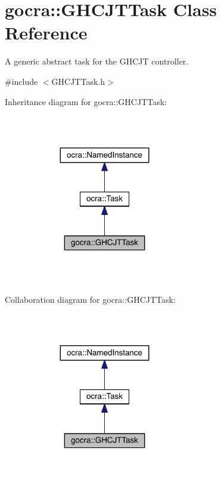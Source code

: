 \hypertarget{classgocra_1_1GHCJTTask}{}\section{gocra\+:\+:G\+H\+C\+J\+T\+Task Class Reference}
\label{classgocra_1_1GHCJTTask}


A generic abstract task for the G\+H\+C\+JT controller.  




{\ttfamily \#include $<$G\+H\+C\+J\+T\+Task.\+h$>$}



Inheritance diagram for gocra\+:\+:G\+H\+C\+J\+T\+Task\+:\nopagebreak
\begin{figure}[H]
\begin{center}
\leavevmode
\includegraphics[width=191pt]{d8/df9/classgocra_1_1GHCJTTask__inherit__graph}
\end{center}
\end{figure}


Collaboration diagram for gocra\+:\+:G\+H\+C\+J\+T\+Task\+:\nopagebreak
\begin{figure}[H]
\begin{center}
\leavevmode
\includegraphics[width=191pt]{db/da9/classgocra_1_1GHCJTTask__coll__graph}
\end{center}
\end{figure}
